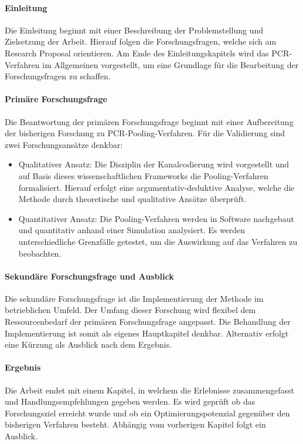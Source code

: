 \paragraph{Einleitung}
Die Einleitung beginnt mit einer Beschreibung der Problemstellung und Zielsetzung der Arbeit.
Hierauf folgen die Forschungsfragen, welche sich am Research Proposal orientieren.
Am Ende des Einleitungskapitels wird das PCR-Verfahren im Allgemeinen vorgestellt, um eine Grundlage für die Bearbeitung der Forschungsfragen zu schaffen.

\paragraph{Primäre Forschungsfrage}
Die Beantwortung der primären Forschungsfrage beginnt mit einer Aufbereitung der bisherigen Forschung zu PCR-Pooling-Verfahren.
Für die Validierung sind zwei Forschungsansätze denkbar:
\begin{itemize}
	\setlength{\itemsep}{-8pt}
	\item Qualitativer Ansatz:
	Die Disziplin der Kanalcodierung wird vorgestellt und auf Basis dieses wissenschaftlichen Frameworks die Pooling-Verfahren formalisiert.
	Hierauf erfolgt eine argumentativ-deduktive Analyse, welche die Methode durch theoretische und qualitative Ansätze überprüft.
	\item Quantitativer Ansatz:
	Die Pooling-Verfahren werden in Software nachgebaut und quantitativ anhand einer Simulation analysiert.
	Es werden unterschiedliche Grenzfälle getestet, um die Auswirkung auf das Verfahren zu beobachten.
\end{itemize}

\paragraph{Sekundäre Forschungsfrage und Ausblick}
Die sekundäre Forschungsfrage ist die Implementierung der Methode im betrieblichen Umfeld.
Der Umfang dieser Forschung wird flexibel dem Ressourcenbedarf der primären Forschungsfrage angepasst.
Die Behandlung der Implementierung ist somit als eigenes Hauptkapitel denkbar.
Alternativ erfolgt eine Kürzung als Ausblick nach dem Ergebnis.

\paragraph{Ergebnis}
Die Arbeit endet mit einem Kapitel, in welchem die Erlebnisse zusammengefasst und Handlungsempfehlungen gegeben werden.
Es wird geprüft ob das Forschungsziel erreicht wurde und ob ein Optimierungspotenzial gegenüber den bisherigen Verfahren besteht.
Abhängig vom vorherigen Kapitel folgt ein Ausblick.